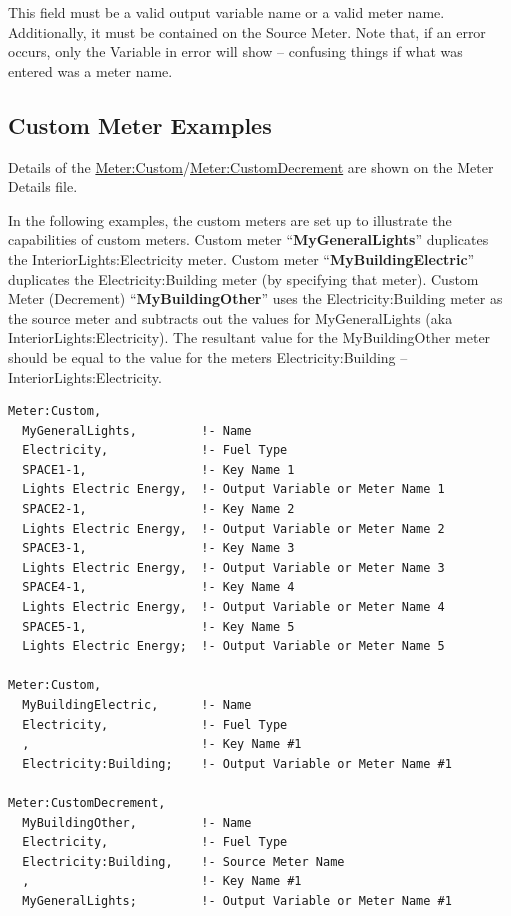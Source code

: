 This field must be a valid output variable name or a valid meter name. Additionally, it must be contained on the Source Meter. Note that, if an error occurs, only the Variable in error will show -- confusing things if what was entered was a meter name.

\subsection{Custom Meter Examples}\label{custom-meter-examples}

Details of the \hyperref[metercustom]{Meter:Custom}/\hyperref[metercustomdecrement]{Meter:CustomDecrement} are shown on the Meter Details file.

In the following examples, the custom meters are set up to illustrate the capabilities of custom meters. Custom meter ``\textbf{MyGeneralLights}'' duplicates the InteriorLights:Electricity meter. Custom meter ``\textbf{MyBuildingElectric}'' duplicates the Electricity:Building meter (by specifying that meter). Custom Meter (Decrement) ``\textbf{MyBuildingOther}'' uses the Electricity:Building meter as the source meter and subtracts out the values for MyGeneralLights (aka InteriorLights:Electricity). The resultant value for the MyBuildingOther meter should be equal to the value for the meters Electricity:Building -- InteriorLights:Electricity.

\begin{lstlisting}
Meter:Custom,
  MyGeneralLights,         !- Name
  Electricity,             !- Fuel Type
  SPACE1-1,                !- Key Name 1
  Lights Electric Energy,  !- Output Variable or Meter Name 1
  SPACE2-1,                !- Key Name 2
  Lights Electric Energy,  !- Output Variable or Meter Name 2
  SPACE3-1,                !- Key Name 3
  Lights Electric Energy,  !- Output Variable or Meter Name 3
  SPACE4-1,                !- Key Name 4
  Lights Electric Energy,  !- Output Variable or Meter Name 4
  SPACE5-1,                !- Key Name 5
  Lights Electric Energy;  !- Output Variable or Meter Name 5

Meter:Custom,
  MyBuildingElectric,      !- Name
  Electricity,             !- Fuel Type
  ,                        !- Key Name #1
  Electricity:Building;    !- Output Variable or Meter Name #1

Meter:CustomDecrement,
  MyBuildingOther,         !- Name
  Electricity,             !- Fuel Type
  Electricity:Building,    !- Source Meter Name
  ,                        !- Key Name #1
  MyGeneralLights;         !- Output Variable or Meter Name #1
\end{lstlisting}

